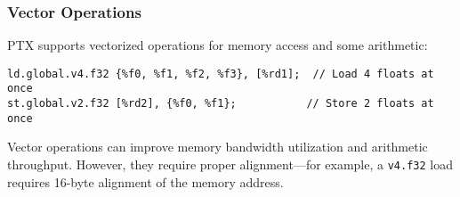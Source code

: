 \subsubsection{Vector Operations}

PTX supports vectorized operations for memory access and some arithmetic:

\begin{lstlisting}[style=ptx]
ld.global.v4.f32 {%f0, %f1, %f2, %f3}, [%rd1];  // Load 4 floats at once
st.global.v2.f32 [%rd2], {%f0, %f1};           // Store 2 floats at once
\end{lstlisting}

Vector operations can improve memory bandwidth utilization and arithmetic throughput. However, they require proper alignment—for example, a \texttt{v4.f32} load requires 16-byte alignment of the memory address.

